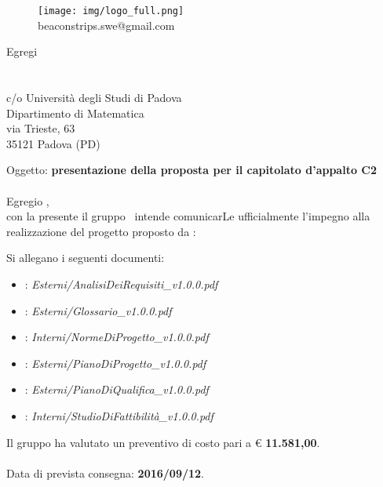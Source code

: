 \documentclass[a4paper]{article}
\newcommand{\spazio}{\vspace{1.5cm}}
\begin{document}
\spazio
\begin{figure}[!h]
	\centering
	\texttt{[image: img/logo\_full.png]} \\
	beaconstrips.swe@gmail.com
\end{figure}

\spazio

\begin{flushright}
\date{\today}
Egregi \\
\COMMITTENTE \\
\CARDIN \\
c/o Università degli Studi di Padova  \\
Dipartimento di Matematica \\
via Trieste, 63 \\
35121 Padova (PD)
\end{flushright}
\spazio

Oggetto: \textbf{presentazione della proposta per il capitolato d'appalto C2} \\ \\
Egregio \COMMITTENTE,\\
con la presente il gruppo \AUTORE \ intende comunicarLe ufficialmente l'impegno alla realizzazione del progetto proposto da \PROPONENTE: \\

Si allegano i seguenti documenti:
\begin{itemize}
	\item \textbf{\ARdoc}: \textit{Esterni/AnalisiDeiRequisiti\_v1.0.0.pdf}
	\item \textbf{\Gldoc}: \textit{Esterni/Glossario\_v1.0.0.pdf}
	\item \textbf{\NPdoc}: \textit{Interni/NormeDiProgetto\_v1.0.0.pdf}
	\item \textbf{\PPdoc}: \textit{Esterni/PianoDiProgetto\_v1.0.0.pdf}
	\item \textbf{\PQdoc}: \textit{Esterni/PianoDiQualifica\_v1.0.0.pdf}
	\item \textbf{\SFdoc}: \textit{Interni/StudioDiFattibilità\_v1.0.0.pdf}
\end{itemize}
\spazio

Il gruppo \AUTORE{} ha valutato un preventivo di costo pari a \euro{} \textbf{11.581,00}. \\ \\
Data di prevista consegna: \textbf{2016/09/12}. \\
\spazio
\end{document}
